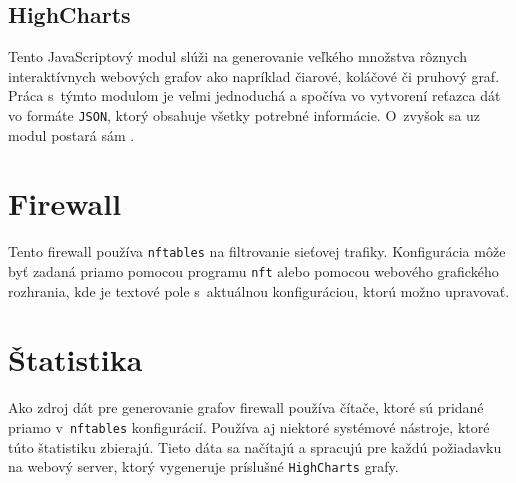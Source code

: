 		\subsection{HighCharts}
		\label{highcharts}
			Tento JavaScriptový modul slúži na generovanie veľkého množstva rôznych interaktívnych webových
			grafov ako napríklad čiarové, koláčové či pruhový graf. Práca s~týmto modulom je veľmi jednoduchá
			a spočíva vo vytvorení reťazca dát vo formáte \texttt{JSON}, ktorý obsahuje všetky potrebné 
			informácie. O~zvyšok sa uz modul postará sám \cite{highcharts}.
		        
	\section{Firewall}
		Tento firewall používa \texttt{nftables} na filtrovanie sieťovej trafiky. Konfigurácia môže byť 
		zadaná priamo pomocou programu \texttt{nft} alebo pomocou webového grafického rozhrania, kde je
		textové pole s~aktuálnou konfiguráciou, ktorú možno upravovať. 
		
	\section{Štatistika}
		Ako zdroj dát pre generovanie grafov firewall používa čítače, ktoré sú pridané priamo v~\texttt{nftables}
		konfigurácií. Používa aj niektoré systémové nástroje, ktoré túto štatistiku zbierajú. Tieto dáta sa 
		načítajú a spracujú pre každú požiadavku na webový server, ktorý vygeneruje príslušné \texttt{HighCharts}
		grafy.